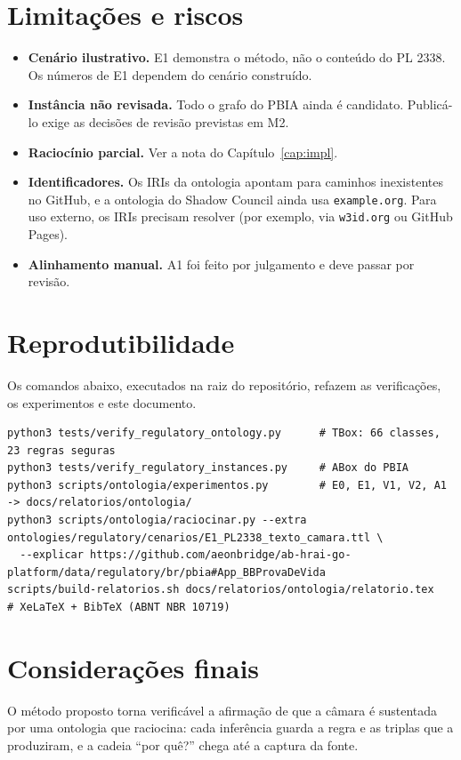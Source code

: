 \documentclass[12pt,a4paper,oneside,english,brazil]{abntex2}
\begin{document}
\chapter{Limitações e riscos}\label{cap:limitacoes}
\begin{itemize}[leftmargin=*]
  \item \textbf{Cenário ilustrativo.} E1 demonstra o método, não o conteúdo do PL 2338. Os números de E1 dependem do cenário construído.
  \item \textbf{Instância não revisada.} Todo o grafo do PBIA ainda é candidato. Publicá-lo exige as decisões de revisão previstas em M2.
  \item \textbf{Raciocínio parcial.} Ver a nota do Capítulo~\ref{cap:impl}.
  \item \textbf{Identificadores.} Os IRIs da ontologia apontam para caminhos inexistentes no GitHub, e a ontologia do Shadow Council ainda usa \texttt{example.org}. Para uso externo, os IRIs precisam resolver (por exemplo, via \texttt{w3id.org} ou GitHub Pages).
  \item \textbf{Alinhamento manual.} A1 foi feito por julgamento e deve passar por revisão.
\end{itemize}

\chapter{Reprodutibilidade}\label{cap:reprodutibilidade}
Os comandos abaixo, executados na raiz do repositório, refazem as verificações, os experimentos e este documento.

\begin{lstlisting}
python3 tests/verify_regulatory_ontology.py      # TBox: 66 classes, 23 regras seguras
python3 tests/verify_regulatory_instances.py     # ABox do PBIA
python3 scripts/ontologia/experimentos.py        # E0, E1, V1, V2, A1 -> docs/relatorios/ontologia/
python3 scripts/ontologia/raciocinar.py --extra ontologies/regulatory/cenarios/E1_PL2338_texto_camara.ttl \
  --explicar https://github.com/aeonbridge/ab-hrai-go-platform/data/regulatory/br/pbia#App_BBProvaDeVida
scripts/build-relatorios.sh docs/relatorios/ontologia/relatorio.tex   # XeLaTeX + BibTeX (ABNT NBR 10719)
\end{lstlisting}

\chapter{Considerações finais}\label{cap:consideracoes}
O método proposto torna verificável a afirmação de que a câmara é sustentada por uma ontologia que raciocina: cada inferência guarda a regra e as triplas que a produziram, e a cadeia ``por quê?'' chega até a captura da fonte.
\end{document}
